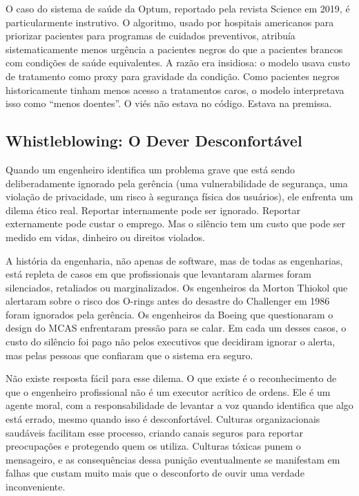 O caso do sistema de saúde da Optum, reportado pela revista Science em
2019, é particularmente instrutivo. O algoritmo, usado por hospitais
americanos para priorizar pacientes para programas de cuidados
preventivos, atribuía sistematicamente menos urgência a pacientes negros
do que a pacientes brancos com condições de saúde equivalentes. A razão
era insidiosa: o modelo usava custo de tratamento como proxy para
gravidade da condição. Como pacientes negros historicamente tinham menos
acesso a tratamentos caros, o modelo interpretava isso como ``menos
doentes''. O viés não estava no código. Estava na premissa.

\subsection{Whistleblowing: O Dever Desconfortável}

Quando um engenheiro identifica um problema grave que está sendo
deliberadamente ignorado pela gerência (uma vulnerabilidade de
segurança, uma violação de privacidade, um risco à segurança física
dos usuários), ele enfrenta um dilema ético real. Reportar internamente
pode ser ignorado. Reportar externamente pode custar o emprego. Mas o
silêncio tem um custo que pode ser medido em vidas, dinheiro ou direitos
violados.

A história da engenharia, não apenas de software, mas de todas as
engenharias, está repleta de casos em que profissionais que levantaram
alarmes foram silenciados, retaliados ou marginalizados. Os engenheiros
da Morton Thiokol que alertaram sobre o risco dos O-rings antes do
desastre do Challenger em 1986 foram ignorados pela gerência. Os
engenheiros da Boeing que questionaram o design do MCAS enfrentaram
pressão para se calar. Em cada um desses casos, o custo do silêncio foi
pago não pelos executivos que decidiram ignorar o alerta, mas pelas
pessoas que confiaram que o sistema era seguro.

Não existe resposta fácil para esse dilema. O que existe é o
reconhecimento de que o engenheiro profissional não é um executor
acrítico de ordens. Ele é um agente moral, com a responsabilidade de
levantar a voz quando identifica que algo está errado, mesmo quando
isso é desconfortável. Culturas organizacionais saudáveis facilitam
esse processo, criando canais seguros para reportar preocupações e
protegendo quem os utiliza. Culturas tóxicas punem o mensageiro, e as
consequências dessa punição eventualmente se manifestam em falhas que
custam muito mais que o desconforto de ouvir uma verdade inconveniente.

